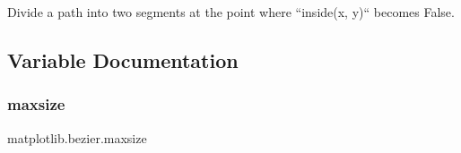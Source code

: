 \begin{DoxyVerb}Divide a path into two segments at the point where ``inside(x, y)`` becomes
False.
\end{DoxyVerb}
 

\subsection{Variable Documentation}
\mbox{\label{namespacematplotlib_1_1bezier_acb9a050d8abfc0f15543650934e49eac}} 
\subsubsection{\texorpdfstring{maxsize}{maxsize}}
{\footnotesize\ttfamily matplotlib.\+bezier.\+maxsize}

